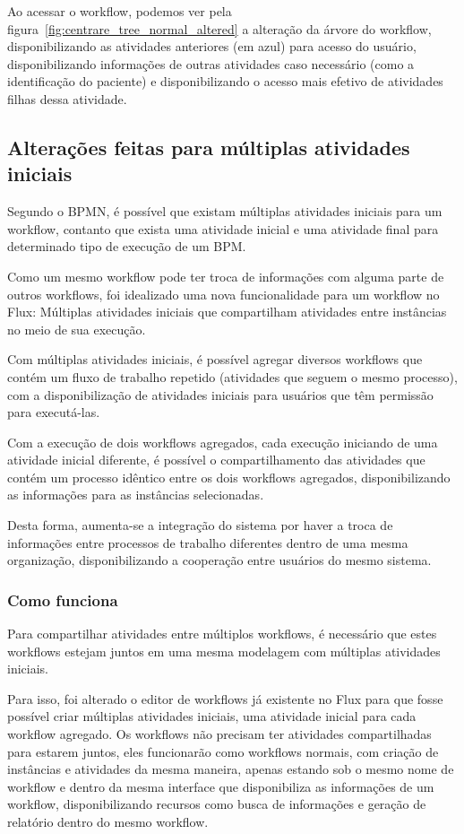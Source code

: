 Ao acessar o workflow, podemos ver pela figura~\ref{fig:centrare_tree_normal_altered} a alteração da árvore do workflow, disponibilizando as atividades anteriores (em azul) para acesso do usuário, disponibilizando informações de outras atividades caso necessário (como a identificação do paciente) e disponibilizando o acesso mais efetivo de atividades filhas dessa atividade.

\subsection{Alterações feitas para múltiplas atividades iniciais}

Segundo o BPMN, é possível que existam múltiplas atividades iniciais para um workflow, contanto que exista uma atividade inicial e uma atividade final para determinado tipo de execução de um BPM.

Como um mesmo workflow pode ter troca de informações com alguma parte de outros workflows, foi idealizado uma nova funcionalidade para um workflow no Flux: Múltiplas atividades iniciais que compartilham atividades entre instâncias no meio de sua execução.

Com múltiplas atividades iniciais, é possível agregar diversos workflows que contém um fluxo de trabalho repetido (atividades que seguem o mesmo processo), com a disponibilização de atividades iniciais para usuários que têm permissão para executá-las.

Com a execução de dois workflows agregados, cada execução iniciando de uma atividade inicial diferente, é possível o compartilhamento das atividades que contém um processo idêntico entre os dois workflows agregados, disponibilizando as informações para as instâncias selecionadas.

Desta forma, aumenta-se a integração do sistema por haver a troca de informações entre processos de trabalho diferentes dentro de uma mesma organização, disponibilizando a cooperação entre usuários do mesmo sistema.

\subsubsection{Como funciona}

Para compartilhar atividades entre múltiplos workflows, é necessário que estes workflows estejam juntos em uma mesma modelagem com múltiplas atividades iniciais.

Para isso, foi alterado o editor de workflows já existente no Flux para que fosse possível criar múltiplas atividades iniciais, uma atividade inicial para cada workflow agregado.
Os workflows não precisam ter atividades compartilhadas para estarem juntos, eles funcionarão como workflows normais, com criação de instâncias e atividades da mesma maneira, apenas estando sob o mesmo nome de workflow e dentro da mesma interface que disponibiliza as informações de um workflow, disponibilizando recursos como busca de informações e geração de relatório dentro do mesmo workflow.

